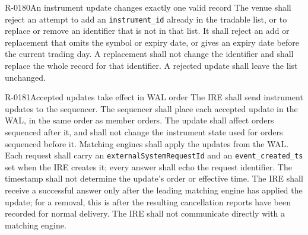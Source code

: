 \begin{requirement}{R-0180}{An instrument update changes exactly one valid record}
  The venue shall reject an attempt to add an \texttt{instrument\_id} already
  in the tradable list, or to replace or remove an identifier that is not in
  that list. It shall reject an add or replacement that omits the symbol or
  expiry date, or gives an expiry date before the current trading day. A
  replacement shall not change the identifier and shall replace the whole
  record for that identifier. A rejected update shall leave the list unchanged.
\end{requirement}

\begin{requirement}{R-0181}{Accepted updates take effect in WAL order}
  The IRE shall send instrument updates to the sequencer. The sequencer shall
  place each accepted update in the WAL, in the same order as member orders.
  The update shall affect orders sequenced after it, and shall not change
  the instrument state used for orders sequenced before it. Matching engines
  shall apply the updates from the WAL. Each request shall carry an
  \texttt{externalSystemRequestId} and an \texttt{event\_created\_ts} set when
  the IRE creates it; every answer shall echo the request identifier. The
  timestamp shall not determine the update's order or effective time. The IRE
  shall receive a successful answer only
  after the leading matching engine has applied the update; for a removal,
  this is after the resulting cancellation reports have been recorded for
  normal delivery. The IRE shall not communicate directly with a matching
  engine.
\end{requirement}

